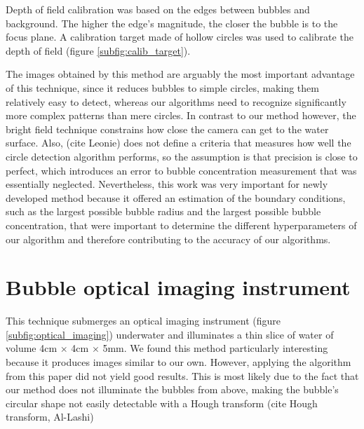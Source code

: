 	Depth of field calibration was based on the edges between bubbles and background. The higher the edge's magnitude, the closer the bubble is to the focus plane. A calibration target made of hollow circles was used to calibrate the depth of field (figure \ref{subfig:calib_target}). 
	
	The images obtained by this method are arguably the most important advantage of this technique, since it reduces bubbles to simple circles, making them relatively easy to detect, whereas our algorithms need to recognize significantly more complex patterns than mere circles.
	 In contrast to our method however, the bright field technique constrains how close the camera can get to the water surface. Also, (cite Leonie) does not define a criteria that measures how well the circle detection algorithm performs, so the assumption is that precision is close to perfect, which introduces an error to bubble concentration measurement that was essentially neglected. 
	 Nevertheless, this work was very important for newly developed method because it offered an estimation of the boundary conditions, such as the largest possible bubble radius and the largest possible bubble concentration, that were important to determine the different hyperparameters of our algorithm and therefore contributing to the accuracy of our algorithms. 
	
	
\section{Bubble optical imaging instrument}
	This technique submerges an optical imaging instrument (figure \ref{subfig:optical_imaging}) underwater and illuminates a thin slice	of water of volume 4cm $\times$ 4cm $\times$ 5mm. We found this method  particularly interesting because it produces images similar to our own. However, applying the algorithm from this paper did not yield good results. This is most likely due to the fact that our method does not illuminate the bubbles from above, making the bubble's circular shape not easily detectable with a Hough transform (cite Hough transform, Al-Lashi)
	
